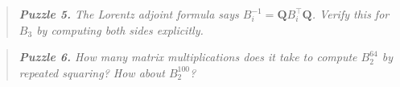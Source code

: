 \begin{quote}
\itshape \textbf{Puzzle 5.} The Lorentz adjoint formula says $B_i^{-1} = \mathbf{Q} B_i^\top \mathbf{Q}$. Verify this for $B_3$ by computing both sides explicitly.
\end{quote}

\begin{quote}
\itshape \textbf{Puzzle 6.} How many matrix multiplications does it take to compute $B_2^{64}$ by repeated squaring? How about $B_2^{100}$?
\end{quote}

